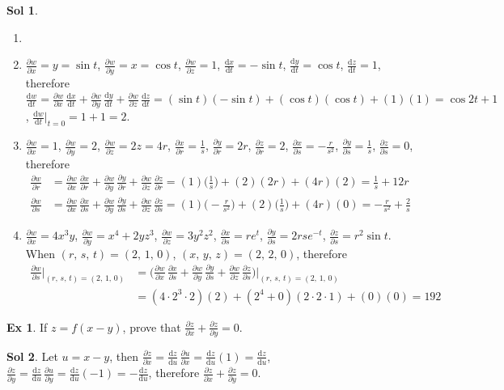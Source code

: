 \documentclass[12pt]{extarticle}
\newcommand{\ds}{\displaystyle}
\theoremstyle{definition}
\newtheorem*{ex}{Ex}
\newtheorem*{sol}{Sol}
\newcommand{\pdiff}[2]{\frac{\partial #1}{\partial #2}}
\newcommand{\diff}[2]{\frac{\mathrm{d} #1}{\mathrm{d} #2}}
\begin{document}
\begin{sol}
  \begin{enumerate}\setlength{\itemsep}{0pt}
    \item[]
    \item $\ds\pdiff{w}{x} = y = \sin t$, $\ds\pdiff{w}{y} = x = \cos t$, $\ds\pdiff{w}{z} = 1$, $\ds\diff{x}{t} = -\sin t$, $\ds\diff{y}{t} = \cos t$, $\ds\diff{z}{t} = 1$, therefore $\ds\diff{w}{t} = \pdiff{w}{x}\,\diff{x}{t} + \pdiff{w}{y}\,\diff{y}{t} + \pdiff{w}{z}\,\diff{z}{t} = (\sin t)(-\sin t) + (\cos t)(\cos t) + (1)(1) = \cos 2t + 1$, $\ds\diff{w}{t}\Big|_{t = 0} = 1 + 1 = 2$. 
    \item $\ds\pdiff{w}{x} = 1$, $\ds\pdiff{w}{y} = 2$, $\ds\pdiff{w}{z} = 2 z = 4 r$, $\ds\pdiff{x}{r} = \frac{1}{s}$, $\ds\pdiff{y}{r} = 2r$, $\ds\pdiff{z}{r} = 2$, $\ds\pdiff{x}{s} = -\frac{r}{s^2}$, $\ds\pdiff{y}{s} = \frac{1}{s}$, $\ds\pdiff{z}{s} = 0$, therefore 
      \begin{align*}
        \pdiff{w}{r} &= \pdiff{w}{x}\,\pdiff{x}{r} + \pdiff{w}{y}\,\pdiff{y}{r} + \pdiff{w}{z}\,\pdiff{z}{r} = (1)\Big(\frac{1}{s}\Big) + (2)(2r) + (4r)(2) = \frac{1}{s} + 12 r \\
        \pdiff{w}{s} &= \pdiff{w}{x}\,\pdiff{x}{s} + \pdiff{w}{y}\,\pdiff{y}{s} + \pdiff{w}{z}\,\pdiff{z}{s} = (1)\Big(-\frac{r}{s^2}\Big) + (2)\Big(\frac{1}{s}\Big) + (4r)(0) = -\frac{r}{s^2} + \frac{2}{s}
      \end{align*}
    \item $\ds\pdiff{w}{x} = 4x^3y$, $\ds\pdiff{w}{y} = x^4 + 2yz^3$, $\ds\pdiff{w}{z} = 3y^2z^2$, $\ds\pdiff{x}{s} = re^{t}$, $\ds\pdiff{y}{s} = 2rse^{-t}$, $\ds\pdiff{z}{s} = r^2\sin t$. When $(r,\,s,\,t) = (2,\,1,\,0)$, $(x,\,y,\,z) = (2,\,2,\,0)$, therefore
      \begin{align*}
        \pdiff{w}{s}\Big|_{(r,\,s,\,t) = (2,\,1,\,0)} &= \Big(\pdiff{w}{x}\,\pdiff{x}{s} + \pdiff{w}{y}\,\pdiff{y}{s} + \pdiff{w}{z}\,\pdiff{z}{s}\Big)\Big|_{(r,\,s,\,t) = (2,\,1,\,0)} \\ &= (4\cdot2^3\cdot2)(2) + (2^4 + 0)(2\cdot2\cdot1) + (0)(0) = 192
      \end{align*}
  \end{enumerate}
\end{sol}

\begin{ex}
  If $\ds z = f(x - y)$, prove that $\ds\pdiff{z}{x} + \pdiff{z}{y} = 0$. 
\end{ex}

\begin{sol} Let $\ds u = x - y$, then $\ds\pdiff{z}{x} = \diff{z}{u}\,\pdiff{u}{x} = \diff{z}{u}(1) = \diff{z}{u}$, $\ds\pdiff{z}{y} = \diff{z}{u}\,\pdiff{u}{y} = \diff{z}{u}(-1) = -\diff{z}{u}$, therefore $\ds\pdiff{z}{x} + \pdiff{z}{y} = 0$. 
\end{sol}
\end{document}
